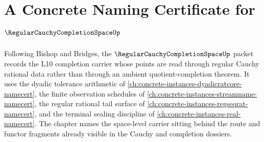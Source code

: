 \chapter{A Concrete Naming Certificate for $\RegularCauchyCompletionSpaceUp$}
\label{ch:concrete-instances-regular-cauchy-completion-space-namecert}

Following Bishop and Bridges, the $\RegularCauchyCompletionSpaceUp$ packet records the L10 completion carrier whose points are read through regular Cauchy rational data rather than through an ambient quotient-completion theorem. It uses the dyadic tolerance arithmetic of \autoref{ch:concrete-instances-dyadicratcore-namecert}, the finite observation schedules of \autoref{ch:concrete-instances-streamname-namecert}, the regular rational tail surface of \autoref{ch:concrete-instances-regseqrat-namecert}, and the terminal sealing discipline of \autoref{ch:concrete-instances-real-namecert}. The chapter names the space-level carrier sitting behind the route and functor fragments already visible in the Cauchy and completion dossiers.

